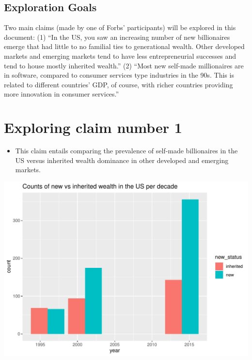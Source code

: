 \documentclass[preprint]{elsarticle}
\let\origfigure\figure
\let\endorigfigure\endfigure
\renewenvironment{figure}[1][2] {
    \expandafter\origfigure\expandafter[H]
} {
    \endorigfigure
}
\numberwithin{equation}{section}
\numberwithin{figure}{section}
\numberwithin{table}{section}
\def\tightlist{} %
\begin{document}
\subsection{Exploration Goals}\label{exploration-goals}

Two main claims (made by one of Forbs' participants) will be explored in
this document: (1) ``In the US, you saw an increasing number of new
billionaires emerge that had little to no familial ties to generational
wealth. Other developed markets and emerging markets tend to have less
entrepreneurial successes and tend to house mostly inherited wealth.''
(2) ``Most new self-made millionaires are in software, compared to
consumer services type industries in the 90s. This is related to
different countries' GDP, of course, with richer countries providing
more innovation in consumer services.''

\section{Exploring claim number 1}\label{exploring-claim-number-1}

\begin{itemize}
\tightlist
\item
  This claim entails comparing the prevalence of self-made billionaires
  in the US versus inherited wealth dominance in other developed and
  emerging markets.
\end{itemize}

\begin{figure}[H]

{\centering \includegraphics{Question4_files/figure-latex/unnamed-chunk-1-1} 

}

\caption{New vs. inherited wealth per decade (US)}\label{fig:unnamed-chunk-1}
\end{figure}
\end{document}
